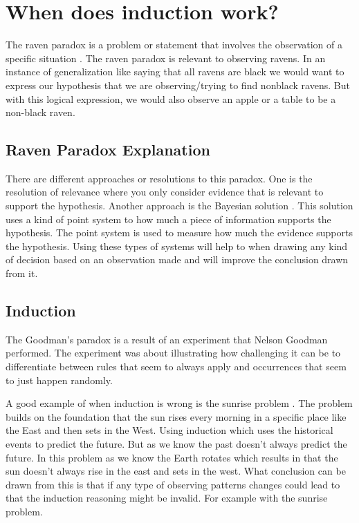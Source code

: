 \documentclass{article}
\begin{document}
\section{When does induction work?}
The raven paradox is a problem or statement that involves the observation of a specific situation \cite{aronson1989bayesians}. The raven paradox is relevant to observing ravens. In an instance of generalization like saying that all ravens are black we would want to express our hypothesis that we are observing/trying to find nonblack ravens. But with this logical expression, we would also observe an apple or a table to be a non-black raven. 

\subsection{Raven Paradox Explanation}
There are different approaches or resolutions to this paradox. One is the resolution of relevance where you only consider evidence that is relevant to support the hypothesis. Another approach is the Bayesian solution \cite{aronson1989bayesians}. This solution uses a kind of point system to how much a piece of information supports the hypothesis. The point system is used to measure how much the evidence supports the hypothesis. Using these types of systems will help to when drawing any kind of decision based on an observation made and will improve the conclusion drawn from it.

\subsection{Induction}
The Goodman's paradox \cite{stemmer1975goodman} is a result of an experiment that Nelson Goodman performed. The experiment was about illustrating how challenging it can be to differentiate between rules that seem to always apply and occurrences that seem to just happen randomly.

A good example of when induction is wrong is the sunrise problem \cite{lee2020resolving}. The problem builds on the foundation that the sun rises every morning in a specific place like the East and then sets in the West. Using induction which uses the historical events to predict the future. But as we know the past doesn't always predict the future. In this problem as we know the Earth rotates which results in that the sun doesn't always rise in the east and sets in the west. What conclusion can be drawn from this is that if any type of observing patterns changes could lead to that the induction reasoning might be invalid. For example with the sunrise problem.
\end{document}
